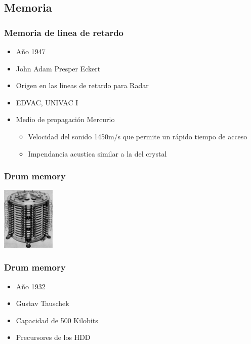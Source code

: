 \documentclass{beamer}
\begin{document}
\subsection{Memoria}
\begin{frame}
\frametitle{Memoria de linea de retardo}
\begin{itemize}
	\item Año 1947
	\item John Adam Presper Eckert
	\item Origen en las lineas de retardo para Radar
	\item EDVAC, UNIVAC I
	\item Medio de propagación Mercurio
		\begin{itemize}
			\item Velocidad del sonido 1450m/s que permite un rápido tiempo de acceso
			\item Impendancia acustica similar a la del crystal 
		\end{itemize}
\end{itemize}
\end{frame}

\begin{frame}
\frametitle{Drum memory}
\includegraphics[height=3cm]{Pamiec_bebnowa_1.jpg}
\end{frame}

\begin{frame}
\frametitle{Drum memory}
\begin{itemize}
	\item Año 1932
	\item Gustav Tauschek
	\item Capacidad de 500 Kilobits
	\item Precursores de los HDD
\end{itemize}
\end{frame}
\end{document}
